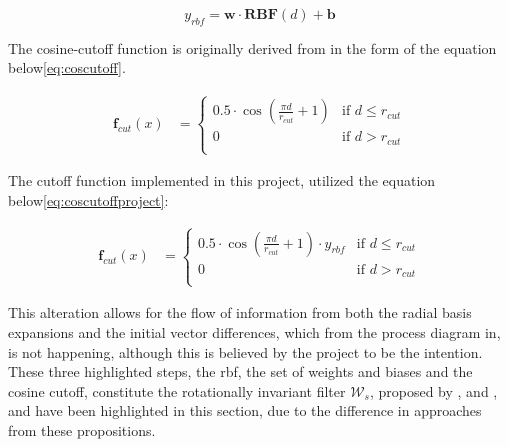 \begin{equation}\label{eq:wandb}
    y_{rbf} = \mathbf{w} \cdot \mathbf{RBF}(d) + \mathbf{b}
\end{equation}

The cosine-cutoff function is originally derived from \cite{Behler2011}
in the form of the equation below\ref{eq:coscutoff}.

\begin{equation}\label{eq:coscutoff}
    \begin{aligned}
        \mathbf{f}_{cut}(x) & =
        \begin{cases}
            0.5 \cdot \cos \left( \frac{\pi d}{r_{cut}} + 1  \right) & \text{if } d \leq r_{cut} \\
            0                                                        & \text{if } d > r_{cut}    \\
        \end{cases}
    \end{aligned}
\end{equation}

The cutoff function implemented in this project, utilized the equation below\ref{eq:coscutoffproject}:

\begin{equation}\label{eq:coscutoffproject}
    \begin{aligned}
        \mathbf{f}_{cut}(x) & =
        \begin{cases}
            0.5 \cdot \cos \left( \frac{\pi d}{r_{cut}} + 1  \right) \cdot y_{rbf} & \text{if } d \leq r_{cut} \\
            0                                                                      & \text{if } d > r_{cut}    \\
        \end{cases}
    \end{aligned}
\end{equation}

This alteration allows for the flow of information from both the radial basis expansions and the initial vector differences,
which from the process diagram in\cite{PAINN}, is not happening, although this is believed by the project to be the intention.
These three highlighted steps, the rbf, the set of weights and biases and the cosine cutoff,
constitute the rotationally invariant filter $\mathcal{W}_{s}$, proposed by \cite{Gasteiger2020},
and \cite{Behler2011}, and have been highlighted in this section, due to the difference in approaches from these propositions.

